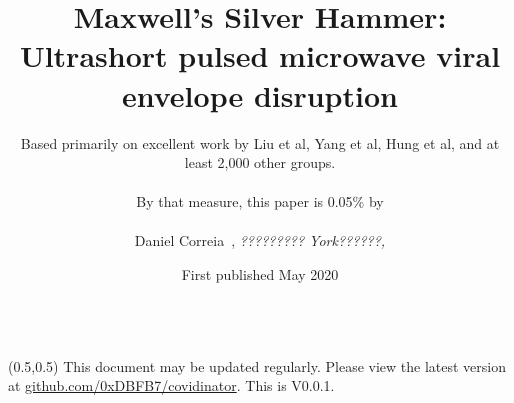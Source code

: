 \documentclass[paper.tex]{subfiles}
\begin{document}
\title{Maxwell's Silver Hammer: Ultrashort pulsed microwave viral envelope disruption\footnotemark}
\date{First published May 2020}
\author{Based primarily on excellent work by Liu et al, Yang et al, Hung et al, and at least 2,000 other groups.\\
	\\
		By that measure, this paper is 0.05\% by \\
		\\
		{Daniel Correia}\ , \textit{????????? York??????,}}



\flushbottom 
\maketitle
\thispagestyle{empty}


\null\begin{tabular}[t]{l@{}}
	  \\
	
\end{tabular}


\begin{textblock}{10}(0.5,0.5)
\noindent This document may be updated regularly. Please view the latest version at \href{https://www.github.com/0xDBFB7/covidinator}{github.com/0xDBFB7/covidinator}. This is V0.0.1.
\end{textblock}
\end{document}
